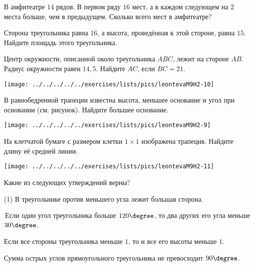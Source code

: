 \begin{class}[number=9]
\begin{listofex}
\item В амфитеатре \( 14 \) рядов. В первом ряду \( 16 \) мест, а в каждом следующем на \( 2  \) места
больше, чем в предыдущем. Сколько всего мест в амфитеатре?
\item Сторона треугольника равна \( 16 \), а высота, проведённая к этой стороне, равна \( 15 \).
Найдите площадь этого треугольника.
\item 
\begin{minipage}[t]{\bodywidth}
	Центр окружности, описанной около треугольника \( ABC \), лежит на стороне \( AB \). Радиус окружности равен \( 14,5 \). Найдите \( AC \), если \( BC = 21 \).
\end{minipage}
\hspace{0.02\linewidth}
\begin{minipage}[t]{\picwidth}
	\texttt{[image: ../../../../../exercises/lists/pics/leontevaM9H2-10]}
\end{minipage}
\item 
\begin{minipage}[t]{\bodywidth}
	В равнобедренной трапеции известна высота, меньшее основание и угол при
	основании (см. рисунок). Найдите большее основание.
\end{minipage}
\hspace{0.02\linewidth}
\begin{minipage}[t]{\picwidth}
	\texttt{[image: ../../../../../exercises/lists/pics/leontevaM9H2-9]}
\end{minipage}
\item 
\begin{minipage}[t]{\bodywidth}
	На клетчатой бумаге с размером клетки \(  1\times 1 \) изображена трапеция. Найдите
	длину её средней линии.
\end{minipage}
\hspace{0.02\linewidth}
\begin{minipage}[t]{\picwidth}
	\texttt{[image: ../../../../../exercises/lists/pics/leontevaM9H2-11]}
\end{minipage}
\item Какие из следующих утверждений верны? \begin{tasks}(1)
	\task В треугольнике против меньшего угла лежит большая сторона.
	
	\task Если один угол треугольника больше \( 120\degree \), то два других его угла меньше \( 30\degree \).
	
	\task Если все стороны треугольника меньше \( 1 \), то и все его высоты меньше \(  1 \).
	
	\task Сумма острых углов прямоугольного треугольника не превосходит \( 90\degree \).
\end{tasks}
	\end{listofex}
\end{class}

